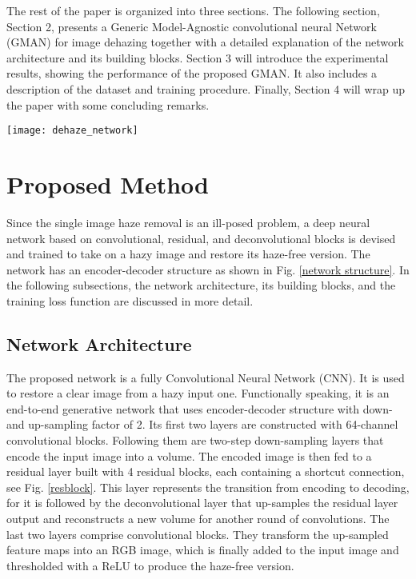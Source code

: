 \documentclass[journal]{IEEEtran}
\begin{document}
The rest of the paper is organized into three sections. The following section, Section 2, presents a Generic Model-Agnostic convolutional neural Network (GMAN) for image dehazing together with a detailed explanation of  the network architecture and its building blocks. Section 3 will introduce the experimental results, showing the performance of the proposed GMAN. It also includes a description of the dataset and training procedure. Finally, Section 4 will wrap up the paper with some concluding remarks.







\begin{figure*}
	\centering
	\texttt{[image: dehaze\_network]}
	\captionsetup{justification=centering}
	\centering\caption{Structure and details of GMAN. The yellow blocks are convolutional layers, the green blocks are down-sampling layers and deconvolutional layers. We cascade 4 residual blocks shown as blue blocks, and the number of convolutional layers inside are 2, 2, 3, 4.}
	\label{network structure}
\end{figure*}

\section{Proposed Method}

Since the single image haze removal is an ill-posed problem, a deep neural network based on convolutional, residual, and deconvolutional blocks is devised and trained to take on a hazy image and restore its haze-free version. The network has an encoder-decoder structure as shown in Fig. \ref{network structure}. In the following subsections, the network architecture, its building blocks, and the training loss function are discussed in more detail.

\subsection{Network Architecture}

The proposed network is a fully Convolutional Neural Network (CNN). It is used to restore a clear image from a hazy input one. Functionally speaking, it is an end-to-end generative network that uses encoder-decoder structure with down- and up-sampling factor of 2. Its first two layers are constructed with 64-channel convolutional blocks. Following them are two-step down-sampling layers that encode the input image into a  volume. The encoded image is then fed to a residual layer built with 4 residual blocks, each containing a shortcut connection, see Fig. \ref{resblock}. This layer represents the transition from encoding to decoding, for it is followed by the deconvolutional layer that up-samples the residual layer output and reconstructs a new  volume for another round of convolutions. The last two layers comprise convolutional blocks. They transform the up-sampled feature maps into an RGB image, which is finally added to the input image and thresholded with a ReLU to produce the haze-free version.
\end{document}
